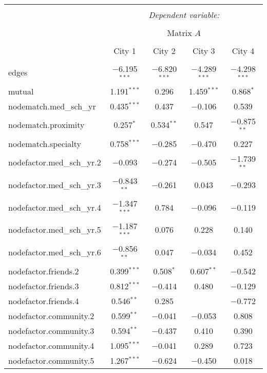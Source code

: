 \documentclass[11pt]{article}
\begin{document}
\clearpage
\begin{table}
\caption{} 
  \label{} 
\begin{tabular}{@{\extracolsep{5pt}}lcccc} 
\\[-1.8ex]\hline 
\hline \\[-1.8ex] 
 & \multicolumn{4}{c}{\textit{Dependent variable:}} \\ 
\cline{2-5} 
\\[-1.8ex] & \multicolumn{4}{c}{Matrix $A$} \\ 
\\[-1.8ex] & City 1 & City 2 & City 3 & City 4\\ 
\hline \\[-1.8ex] 
 edges & $-$6.195$^{***}$ & $-$6.820$^{***}$ & $-$4.289$^{***}$ & $-$4.298$^{***}$ \\ 
  mutual & 1.191$^{***}$ & 0.296 & 1.459$^{***}$ & 0.868$^{*}$ \\ 
  nodematch.med\_sch\_yr & 0.435$^{***}$ & 0.437 & $-$0.106 & 0.539 \\ 
  nodematch.proximity & 0.257$^{*}$ & 0.534$^{**}$ & 0.547 & $-$0.875$^{**}$ \\ 
  nodematch.specialty & 0.758$^{***}$ & $-$0.285 & $-$0.470 & 0.227 \\ 
  nodefactor.med\_sch\_yr.2 & $-$0.093 & $-$0.274 & $-$0.505 & $-$1.739$^{**}$ \\ 
  nodefactor.med\_sch\_yr.3 & $-$0.843$^{**}$ & $-$0.261 & 0.043 & $-$0.293 \\ 
  nodefactor.med\_sch\_yr.4 & $-$1.347$^{***}$ & 0.784 & $-$0.096 & $-$0.119 \\ 
  nodefactor.med\_sch\_yr.5 & $-$1.187$^{***}$ & 0.076 & 0.228 & 0.140 \\ 
  nodefactor.med\_sch\_yr.6 & $-$0.856$^{**}$ & 0.047 & $-$0.034 & 0.452 \\ 
  nodefactor.friends.2 & 0.399$^{***}$ & 0.508$^{*}$ & 0.607$^{**}$ & $-$0.542 \\ 
  nodefactor.friends.3 & 0.812$^{***}$ & $-$0.414 & 0.480 & $-$0.129 \\ 
  nodefactor.friends.4 & 0.546$^{**}$ & 0.285 &  & $-$0.772 \\ 
  nodefactor.community.2 & 0.599$^{**}$ & $-$0.041 & $-$0.053 & 0.808 \\ 
  nodefactor.community.3 & 0.594$^{**}$ & $-$0.437 & 0.410 & 0.390 \\ 
  nodefactor.community.4 & 1.095$^{***}$ & $-$0.041 & 0.289 & 0.723 \\ 
  nodefactor.community.5 & 1.267$^{***}$ & $-$0.624 & $-$0.450 & 0.018 \\ 

\end{tabular}
\end{table}
\end{document}
